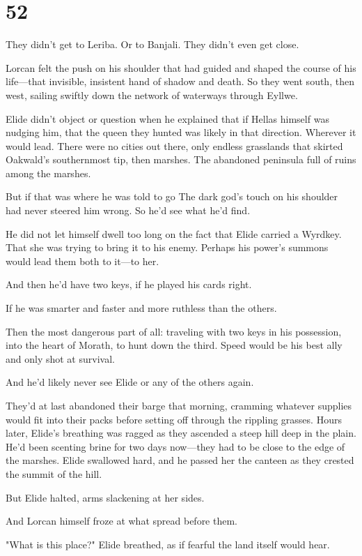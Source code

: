 
\chapter{52}

They didn't get to Leriba. Or to Banjali. They didn't even get close.

Lorcan felt the push on his shoulder that had guided and shaped the course of his life---that invisible, insistent hand of shadow and death. So they went south, then west, sailing swiftly down the network of waterways through Eyllwe.

Elide didn't object or question when he explained that if Hellas himself was nudging him, that the queen they hunted was likely in that direction. Wherever it would lead. There were no cities out there, only endless grasslands that skirted Oakwald's southernmost tip, then marshes. The abandoned peninsula full of ruins among the marshes.

But if that was where he was told to go  The dark god's touch on his shoulder had never steered him wrong. So he'd see what he'd find.

He did not let himself dwell too long on the fact that Elide carried a Wyrdkey. That she was trying to bring it to his enemy. Perhaps his power's summons would lead them both to it---to her.

And then he'd have two keys, if he played his cards right.

If he was smarter and faster and more ruthless than the others.

Then the most dangerous part of all: traveling with two keys in his possession, into the heart of Morath, to hunt down the third. Speed would be his best ally and only shot at survival.

And he'd likely never see Elide or any of the others again.

They'd at last abandoned their barge that morning, cramming whatever supplies would fit into their packs before setting off through the rippling grasses. Hours later, Elide's breathing was ragged as they ascended a steep hill deep in the plain. He'd been scenting brine for two days now---they had to be close to the edge of the marshes. Elide swallowed hard, and he passed her the canteen as they crested the summit of the hill.

But Elide halted, arms slackening at her sides.

And Lorcan himself froze at what spread before them.

"What is this place?" Elide breathed, as if fearful the land itself would hear.

